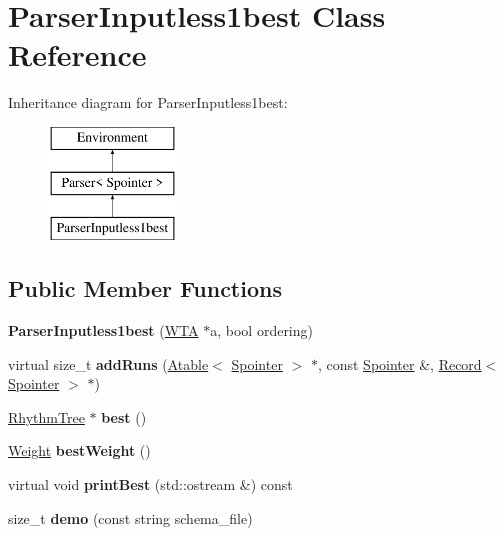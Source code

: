 \hypertarget{classParserInputless1best}{}\section{Parser\+Inputless1best Class Reference}
\label{classParserInputless1best}
Inheritance diagram for Parser\+Inputless1best\+:\begin{figure}[H]
\begin{center}
\leavevmode
\includegraphics[height=3.000000cm]{classParserInputless1best}
\end{center}
\end{figure}
\subsection*{Public Member Functions}
\begin{DoxyCompactItemize}
\item 
\mbox{\label{classParserInputless1best_a9d73a9aafea39466febe8a05d178c9ce}} 
{\bfseries Parser\+Inputless1best} (\mbox{\hyperlink{classWTA}{W\+TA}} $\ast$a, bool ordering)
\item 
\mbox{\label{classParserInputless1best_a57d0edee7873af69c638055797cf1f53}} 
virtual size\+\_\+t {\bfseries add\+Runs} (\mbox{\hyperlink{classAtable}{Atable}}$<$ \mbox{\hyperlink{classSpointer}{Spointer}} $>$ $\ast$, const \mbox{\hyperlink{classSpointer}{Spointer}} \&, \mbox{\hyperlink{classRecord}{Record}}$<$ \mbox{\hyperlink{classSpointer}{Spointer}} $>$ $\ast$)
\item 
\mbox{\label{classParserInputless1best_afa9966dbe5919941383595c859b2dd52}} 
\mbox{\hyperlink{classRhythmTree}{Rhythm\+Tree}} $\ast$ {\bfseries best} ()
\item 
\mbox{\label{classParserInputless1best_aafe2f05fbb60762695664d74e69ae676}} 
\mbox{\hyperlink{classWeight}{Weight}} {\bfseries best\+Weight} ()
\item 
\mbox{\label{classParserInputless1best_a3b12f588f0510bf15fcdd042802d4b5f}} 
virtual void {\bfseries print\+Best} (std\+::ostream \&) const
\item 
\mbox{\label{classParserInputless1best_a591f18315a4dff7ad51d916736a853d9}} 
size\+\_\+t {\bfseries demo} (const string schema\+\_\+file)
\end{DoxyCompactItemize}
